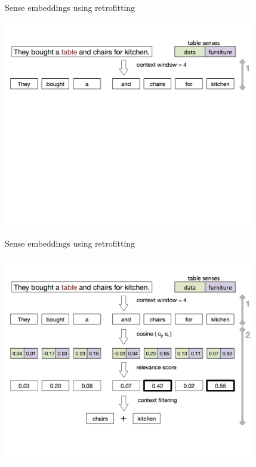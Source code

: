 \begin{frame}{Sense embeddings using retrofitting}
\vspace{-3em}
\begin{center}
\includegraphics[width=0.82\textwidth]{figures/wsd-2}
\end{center}	
\end{frame}



\begin{frame}{Sense embeddings using retrofitting}
\vspace{-3em}
\begin{center}
\includegraphics[width=0.82\textwidth]{figures/wsd-3}
\end{center}	
\end{frame}



